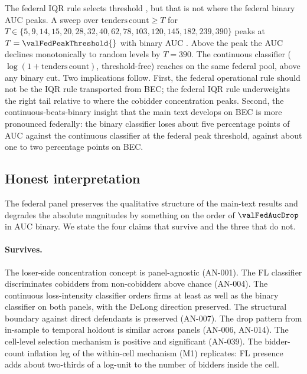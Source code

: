 The federal IQR rule selects threshold \valFedFLthreshold{}, but
that is not where the federal binary AUC peaks. A sweep over
$\mathrm{tenders\,count} \geq T$ for $T \in \{5, 9, 14, 15, 20,
28, 32, 40, 62, 78, 103, 120, 145, 182, 239, 390\}$ peaks at
$T = \valFedPeakThreshold{}$ with binary AUC
\valFedPeakAUC{}. Above the peak the AUC declines monotonically
to random levels by $T = 390$. The continuous classifier
($\log(1 + \mathrm{tenders\,count})$, threshold-free) reaches
\valFedAucContinuous{} on the same federal pool, above any
binary cut. Two implications follow. First, the federal
operational rule should not be the IQR rule transported from BEC;
the federal IQR rule underweights the right tail relative to
where the cobidder concentration peaks. Second, the
continuous-beats-binary insight that the main text develops on
BEC is more pronounced federally: the binary classifier loses
about five percentage points of AUC against the continuous
classifier at the federal peak threshold, against about one to
two percentage points on BEC.

\subsection{Honest interpretation}
\label{app:comprasnet_interpretation}

The federal panel preserves the qualitative structure of the
main-text results and degrades the absolute magnitudes by
something on the order of $\valFedAucDrop$ in AUC binary. We
state the four claims that survive and the three that do not.

\paragraph{Survives.} The loser-side concentration concept is
panel-agnostic (AN-001). The FL classifier discriminates
cobidders from non-cobidders above chance (AN-004). The continuous
loss-intensity classifier orders firms at least as well as the
binary classifier on both panels, with the DeLong direction
preserved. The structural boundary against
direct defendants is preserved (AN-007). The drop pattern from
in-sample to temporal holdout is similar across panels
(AN-006, AN-014). The cell-level selection mechanism is
positive and significant (AN-039). The bidder-count inflation
leg of the within-cell mechanism (M1) replicates: FL presence
adds about two-thirds of a log-unit to the number of bidders
inside the cell.


